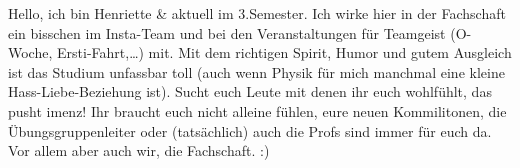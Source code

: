 \begin{multicols}{2}
{
Hello, ich bin Henriette \& aktuell im 3.Semester. Ich wirke hier in der Fachschaft ein bisschen im Insta-Team und bei den Veranstaltungen für Teamgeist (O-Woche, Ersti-Fahrt,…) mit. 
Mit dem richtigen Spirit, Humor und gutem Ausgleich ist das Studium unfassbar toll (auch wenn Physik für mich manchmal eine kleine Hass-Liebe-Beziehung ist).
Sucht euch Leute mit denen ihr euch wohlfühlt, das pusht imenz! 
Ihr braucht euch nicht alleine fühlen, eure neuen Kommilitonen, die Übungsgruppenleiter oder (tatsächlich) auch die Profs sind immer für euch da. Vor allem aber auch wir, die Fachschaft. :)
}


\end{multicols}
